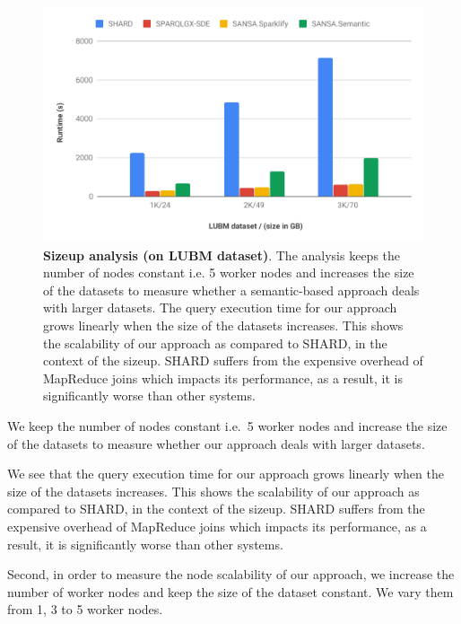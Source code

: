 \begin{figure}
 \includegraphics[width=1.0\columnwidth]{images/6_scalable_rdf_querying/semantic-based-sizeup-scalability.pdf}
    \caption{\textbf{Sizeup analysis (on LUBM dataset)}.
    The analysis keeps the number of nodes constant i.e. 5 worker nodes and increases the size of the datasets to measure whether a semantic-based approach deals with larger datasets.
    The query execution time for our approach grows linearly when the size of the datasets increases.
    This shows the scalability of our approach as compared to SHARD, in the context of the sizeup.
    SHARD suffers from the expensive overhead of MapReduce joins which impacts its performance, as a result, it is significantly worse than other systems.
    }
    \label{fig:semantic-based-sizeup-scalability}
\end{figure}

We keep the number of nodes constant i.e.\ 5 worker nodes and increase the size of the datasets to measure whether our approach deals with larger datasets.

We see that the query execution time for our approach grows linearly when the size of the datasets increases.
This shows the scalability of our approach as compared to SHARD, in the context of the sizeup.
SHARD suffers from the expensive overhead of MapReduce joins which impacts its performance, as a result, it is significantly worse than other systems.

Second, in order to measure the node scalability of our approach, we increase the number of worker nodes and keep the size of the dataset constant.
We vary them from 1, 3 to 5 worker nodes.

